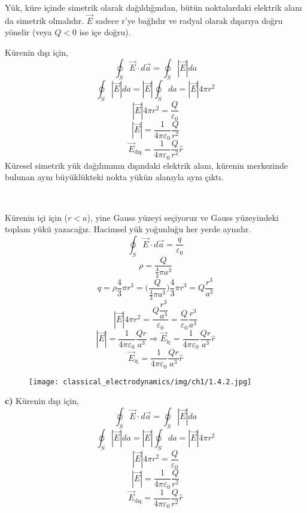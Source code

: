 \begin{center}
\begin{note}[Giancoli]
 Yük, küre içinde simetrik olarak dağıldığından, bütün noktalardaki elektrik alanı da simetrik olmalıdır. $\Vec{E}$ sadece r'ye bağlıdır ve radyal olarak dışarıya doğru yönelir (veya $Q<0$ ise içe doğru).
\end{note}
\end{center}
Kürenin dışı için,
\[  \oint_{S} \Vec{E} \cdot d\Vec{a} = \oint_{S} |\Vec{E}| da \]
\[\oint_{S}  |\Vec{E}| da =  |\Vec{E}| \oint_{S} da =  |\Vec{E}| 4 \pi r^{2} \]
\[  |\Vec{E}| 4 \pi r^{2} = \dfrac{Q}{\varepsilon_{0}} \]
\[  |\Vec{E}|  = \dfrac{1}{4 \pi \varepsilon_{0} }\dfrac{Q}{r^{2}}  \]
\[  \Vec{E}_{\textrm{dış}}  = \dfrac{1}{4 \pi \varepsilon_{0} }\dfrac{Q}{r^{2}} \hat{r}  \]
Küresel simetrik yük dağılımının dışındaki elektrik alanı, kürenin merkezinde bulunan aynı büyüklükteki nokta yükün alanıyla aynı çıktı. 

\ 

Kürenin içi için ($r<a$), yine Gauss yüzeyi seçiyoruz ve Gauss yüzeyindeki toplam yükü yazacağız. Hacimsel yük yoğunluğu her yerde aynıdır.
\[ \oint_{S} \Vec{E} \cdot d\Vec{a} = \dfrac{q}{\varepsilon_{0}}\]
\[ \rho = \dfrac{Q}{\frac{4}{3} \pi a^{3}} \]
\[ q = \rho \dfrac{4}{3} \pi r^{3} = \Bigg(  \dfrac{Q}{\frac{4}{3} \pi a^{3}} \Bigg) \dfrac{4}{3} \pi r^{3} = Q \dfrac{ r^{3}}{a^{3}} \]
\[  |\Vec{E}| 4 \pi r^{2} = \dfrac{ Q \dfrac{ r^{3}}{a^{3}}}{\varepsilon_{0}} = \dfrac{Q}{\varepsilon_{0}} \dfrac{ r^{3}}{a^{3}} \]
\[  |\Vec{E}| =  \dfrac{1}{4 \pi \varepsilon_{0}}  \dfrac{Q r}{ a^{3} } \Rightarrow \Vec{E}_{\textrm{iç}}  = \dfrac{1}{4 \pi \varepsilon_{0}}  \dfrac{Q r}{ a^{3} } \hat{r}  \]
\[  \Vec{E}_{\textrm{iç}}  = \dfrac{1}{4 \pi \varepsilon_{0}}  \dfrac{Q r}{ a^{3} } \hat{r}  \]
\begin{figure}[h!]
\centering
\texttt{[image: classical\_electrodynamics/img/ch1/1.4.2.jpg]}
\end{figure} 

\newpage
\textbf{c)} Kürenin dışı için,
\[  \oint_{S} \Vec{E} \cdot d\Vec{a} = \oint_{S} |\Vec{E}| da \]
\[\oint_{S}  |\Vec{E}| da =  |\Vec{E}| \oint_{S} da =  |\Vec{E}| 4 \pi r^{2} \]
\[  |\Vec{E}| 4 \pi r^{2} = \dfrac{Q}{\varepsilon_{0}} \]
\[  |\Vec{E}|  = \dfrac{1}{4 \pi \varepsilon_{0} }\dfrac{Q}{r^{2}}  \]
\[  \Vec{E}_{\textrm{dış}}  = \dfrac{1}{4 \pi \varepsilon_{0} }\dfrac{Q}{r^{2}} \hat{r}  \]

